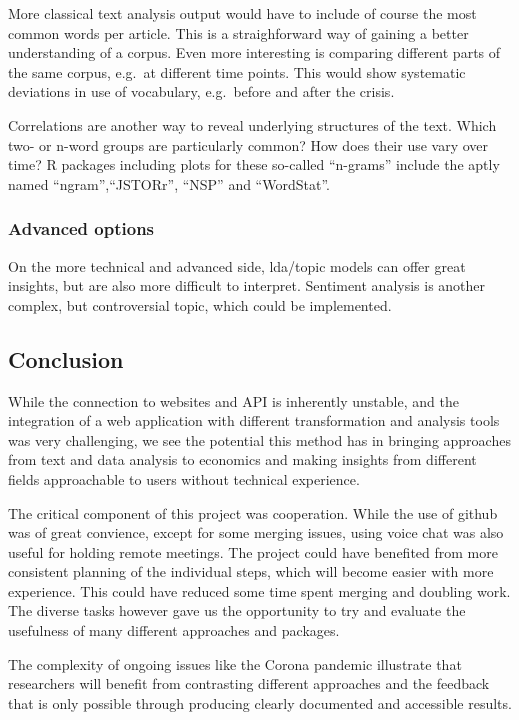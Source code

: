 \documentclass[12pt,a4paper]{article}
\begin{document}
More classical text analysis output would have to include of course the most common words per article. This is a straighforward way of gaining a better understanding of a corpus. Even more interesting is comparing different parts of the same corpus, e.g.~at different time points. This would show systematic deviations in use of vocabulary, e.g.~before and after the crisis.

Correlations are another way to reveal underlying structures of the text. Which two- or n-word groups are particularly common? How does their use vary over time? R packages including plots for these so-called \enquote{n-grams} include the aptly named \enquote{ngram},\enquote{JSTORr}, \enquote{NSP} and \enquote{WordStat}.

\hypertarget{advanced-options}{%
\subsubsection{Advanced options}\label{advanced-options}}

On the more technical and advanced side, lda/topic models can offer great insights, but are also more difficult to interpret. Sentiment analysis is another complex, but controversial topic, which could be implemented.

\hypertarget{conclusion}{%
\subsection{Conclusion}\label{conclusion}}

While the connection to websites and API is inherently unstable, and the integration of a web application with different transformation and analysis tools was very challenging, we see the potential this method has in bringing approaches from text and data analysis to economics and making insights from different fields approachable to users without technical experience.

The critical component of this project was cooperation. While the use of github was of great convience, except for some merging issues, using voice chat was also useful for holding remote meetings. The project could have benefited from more consistent planning of the individual steps, which will become easier with more experience. This could have reduced some time spent merging and doubling work. The diverse tasks however gave us the opportunity to try and evaluate the usefulness of many different approaches and packages.

The complexity of ongoing issues like the Corona pandemic illustrate that researchers will benefit from contrasting different approaches and the feedback that is only possible through producing clearly documented and accessible results.
\end{document}
